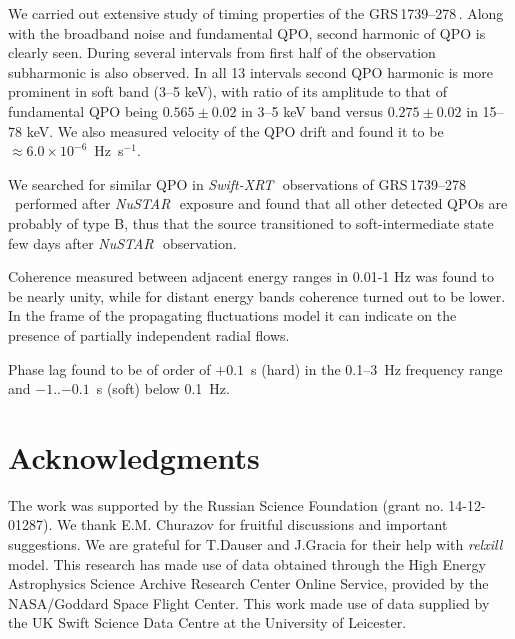 \documentclass[a4paper,fleqn,usenatbib]{mnras}
\def\grs{{GRS\,1739--278\,}}
\def\swiftx{{\em Swift-XRT\,}}
\def\nustar{{\em NuSTAR\,}}
\begin{document}
We carried out extensive study of timing properties of the \grs. 
Along with the broadband noise and fundamental QPO, second harmonic of QPO is clearly seen. 
During several intervals from first half of the observation subharmonic is also observed. 
In all 13 intervals second QPO harmonic is more prominent in soft band (3--5 keV), with ratio of its amplitude to that of fundamental QPO being $0.565\pm0.02$ in 3--5 keV band versus $0.275\pm0.02$ in 15--78 keV.
We also measured velocity of the QPO drift and found it to be $\approx6.0\times10^{-6}$~Hz~s$^{-1}$. 

We searched for similar QPO in \swiftx\, observations of \grs\ performed after \nustar\, exposure and found that all other detected QPOs are probably of type B, thus that the source transitioned to soft-intermediate state few days after \nustar\ observation.

Coherence measured between adjacent energy ranges in 0.01-1 Hz was found to be nearly unity, while for distant energy bands coherence turned out to be lower. 
In the frame of the propagating fluctuations model it can indicate on the presence of partially independent radial flows.

Phase lag found to be of order of $+0.1$~s (hard) in the 0.1--3~Hz frequency range and $-1$..$-0.1$~s (soft) below 0.1~Hz.


\section*{Acknowledgments}
The work was supported by the Russian Science Foundation (grant no. 14-12-01287). 
We thank E.M. Churazov for fruitful discussions and important suggestions. 
We are grateful for T.Dauser and J.Gracia for their help with {\em relxill} model. 
This research has made use of data obtained through the High Energy Astrophysics Science Archive Research Center Online Service, provided by the NASA/Goddard Space Flight Center.
This work made use of data supplied by the UK Swift Science Data Centre at the University of Leicester.



\bsp	
\label{lastpage}
\end{document}
